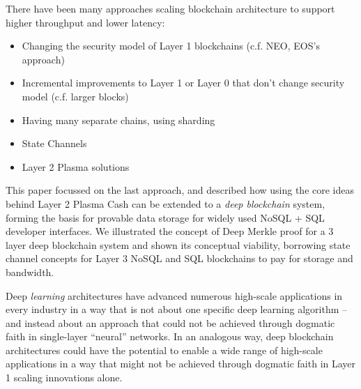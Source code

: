 \documentclass{article}
\begin{document}
There have been many approaches scaling blockchain architecture to support higher throughput and lower latency:

\begin{itemize}
\item Changing the security model of Layer 1 blockchains (c.f. NEO, EOS's approach)

\item Incremental improvements to Layer 1 or Layer 0 that don't change security model (c.f. larger blocks)

\item Having many separate chains, using sharding  

\item State Channels

\item Layer 2 Plasma solutions
\end{itemize}

This paper focussed on the last approach, and described how using the core ideas behind Layer 2 Plasma Cash can be extended to a {\em deep blockchain} system, forming the basis for provable data storage for widely used NoSQL + SQL developer interfaces.  We illustrated the concept of Deep Merkle proof for a 3 layer deep blockchain system and shown its conceptual viability, borrowing state channel concepts for Layer 3 NoSQL and SQL blockchains to pay for storage and bandwidth.

Deep {\em learning} architectures have advanced numerous high-scale applications in every industry in a way that is not about one specific deep learning algorithm -- and instead about an approach that could not be achieved through dogmatic faith in single-layer ``neural'' networks.   In an analogous way, deep blockchain architectures could have the potential to enable a wide range of high-scale applications in a way that might not be achieved through dogmatic faith in Layer 1 scaling innovations alone.  
\end{document}
